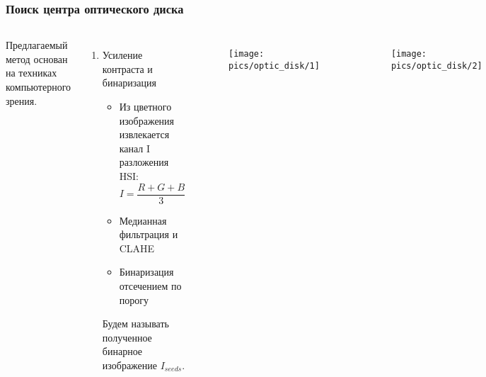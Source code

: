 \documentclass{beamer}
\begin{document}
\begin{frame}
	\frametitle{Поиск центра оптического диска}
	\begin{columns}[c]
		Предлагаемый метод основан на техниках компьютерного зрения.
		\begin{enumerate}
			\item Усиление контраста и бинаризация
			\begin{itemize}
				\item Из цветного изображения извлекается канал I разложения HSI:
				$$ I = \frac{R + G + B}{3} $$
				
				\item Медианная фильтрация и CLAHE
				\item Бинаризация отсечением по порогу
			\end{itemize}
			Будем называть полученное бинарное изображение $I_{seeds}$.
		\end{enumerate}
		\begin{figure}[t!]
			\texttt{[image: pics/optic\_disk/1]}
			\label{fig:1}
		\end{figure}
		\begin{figure}[t!]
			\texttt{[image: pics/optic\_disk/2]}
			\label{fig:2}
		\end{figure}
		\begin{figure}[t!]
			\texttt{[image: pics/optic\_disk/3]}
			\label{fig:3}
		\end{figure}
	\end{columns}
	
\end{frame}

\end{document}
